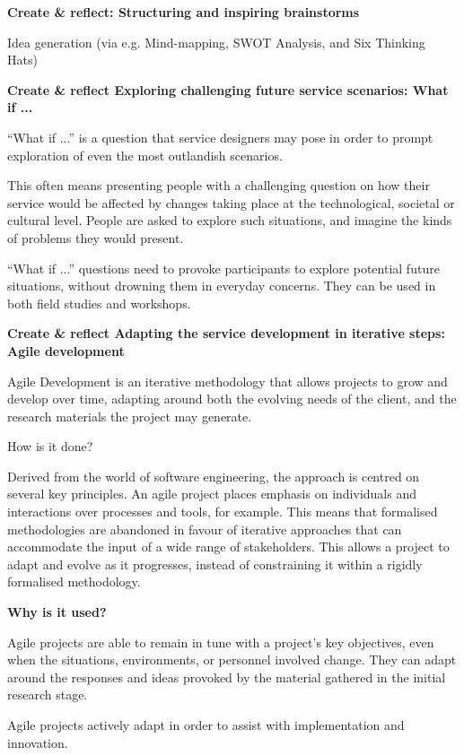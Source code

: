 
\textbf{Create \& reflect: Structuring and inspiring brainstorms}

Idea generation (via e.g. Mind-mapping, SWOT Analysis, and Six Thinking Hats)

\textbf{Create \& reflect Exploring challenging future service scenarios: What if ...}

“What if ...” is a question that service designers may pose in order to prompt exploration of even the most outlandish scenarios.

This often means presenting people with a challenging question on how their service would be affected by changes taking place at the technological, societal or cultural level. People are asked to explore such situations, and imagine the kinds of problems they would present.

“What if ...” questions need to provoke participants to explore potential future situations, without drowning them in everyday concerns. They can be used in both field studies and workshops.

\textbf{Create \& reflect Adapting the service development in iterative steps: Agile development}

Agile Development is an iterative methodology that allows projects to grow and develop over time, adapting around both the evolving needs of the client, and the research materials the project may generate.

How is it done?

Derived from the world of software engineering, the approach is centred on several key principles. An agile project places emphasis on individuals and interactions over processes and tools, for example. This means that formalised methodologies are abandoned in favour of iterative approaches that can accommodate the input of a wide range of stakeholders. This allows a project to adapt and evolve as it progresses, instead of constraining it within a rigidly formalised methodology.

\textbf{Why is it used?}

Agile projects are able to remain in tune with a project’s key objectives, even when the situations, environments, or personnel involved change. They can adapt around the responses and ideas provoked by the material gathered in the initial research stage.

Agile projects actively adapt in order to assist with implementation and innovation.

